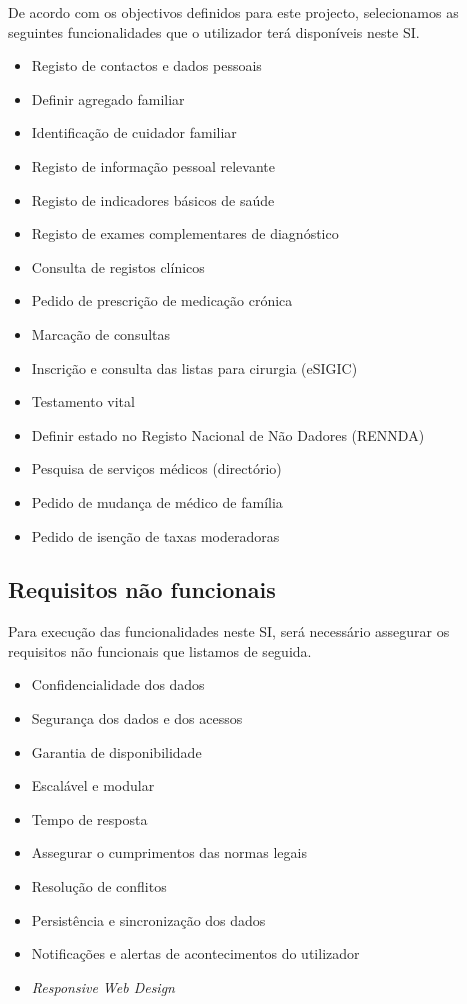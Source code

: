 \documentclass[12pt, a4paper, twoside]{report} %
\begin{document}
De acordo com os objectivos definidos para este projecto, selecionamos as seguintes funcionalidades que o utilizador terá disponíveis neste SI.

\begin{itemize}

\item Registo de contactos e dados pessoais
\item Definir agregado familiar 
\item Identificação de cuidador familiar
\item Registo de informação pessoal relevante
\item Registo de indicadores básicos de saúde
\item Registo de exames complementares de diagnóstico
\item Consulta de registos clínicos
\item Pedido de prescrição de medicação crónica
\item Marcação de consultas
\item Inscrição e consulta das listas para cirurgia (eSIGIC)
\item Testamento vital
\item Definir estado no Registo Nacional de Não Dadores (RENNDA)
\item Pesquisa de serviços médicos (directório)
\item Pedido de mudança de médico de família
\item Pedido de isenção de taxas moderadoras

\end{itemize}


\subsection{Requisitos não funcionais}

Para execução das funcionalidades neste SI, será necessário assegurar os requisitos não funcionais que listamos de seguida.

\begin{itemize}
\item Confidencialidade dos dados
\item Segurança dos dados e dos acessos
\item Garantia de disponibilidade
\item Escalável e modular
\item Tempo de resposta
\item Assegurar o cumprimentos das normas legais
\item Resolução de conflitos
\item Persistência e sincronização dos dados
\item Notificações e alertas de acontecimentos do utilizador
\item \textit {Responsive Web Design}
\end{itemize}
\end{document}
